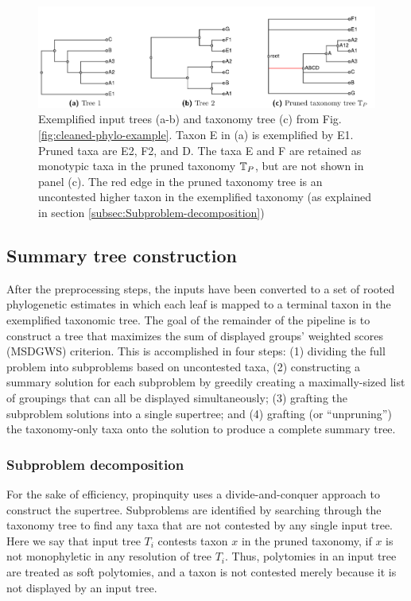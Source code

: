 \documentclass[fleqn,12pt,lineno,english]{wlpeerj}
\begin{document}
\begin{figure}
\includegraphics[width=1.0\textwidth]{Fig5}

\caption{Exemplified input trees (a-b) and taxonomy tree (c) from Fig. \ref{fig:cleaned-phylo-example}.
Taxon E in (a) is exemplified by E1. Pruned taxa are E2, F2, and D. The
taxa E and F are retained as monotypic taxa in the pruned taxonomy
$\protect\mbox{\ensuremath{\mathbb{T}}}_{P}$, but are not shown in panel (c). The red
edge in the pruned taxonomy tree is an uncontested higher taxon in
the exemplified taxonomy (as explained in section \ref{subsec:Subproblem-decomposition})}
\label{fig:exemplify-example}
\end{figure}


\subsection{Summary tree construction}

After the preprocessing steps, the inputs have been converted to a
set of rooted phylogenetic estimates in which each leaf is mapped
to a terminal taxon in the exemplified taxonomic tree. The goal of
the remainder of the pipeline is to construct a tree that maximizes
the sum of displayed groups' weighted scores (MSDGWS) criterion. This is accomplished
in four steps: (1) dividing the full problem into subproblems based
on uncontested taxa, (2) constructing a summary solution for each
subproblem by greedily creating a maximally-sized list of groupings
that can all be displayed simultaneously; (3) grafting the subproblem
solutions into a single supertree; and (4) grafting (or ``unpruning'')
the taxonomy-only taxa onto the solution to produce a complete summary
tree.

\subsubsection{Subproblem decomposition\label{subsec:Subproblem-decomposition}}

For the sake of efficiency, propinquity uses a divide-and-conquer
approach to construct the supertree. Subproblems are identified by
searching through the taxonomy tree to find any taxa that are not contested
by any single input tree. Here we say that input tree $T_{i}$ contests
taxon $x$ in the pruned taxonomy, if $x$ is not monophyletic in
any resolution of tree $T_{i}$. Thus, polytomies in an input tree
are treated as soft polytomies, and a taxon is not contested merely
because it is not displayed by an input tree. 
\end{document}
